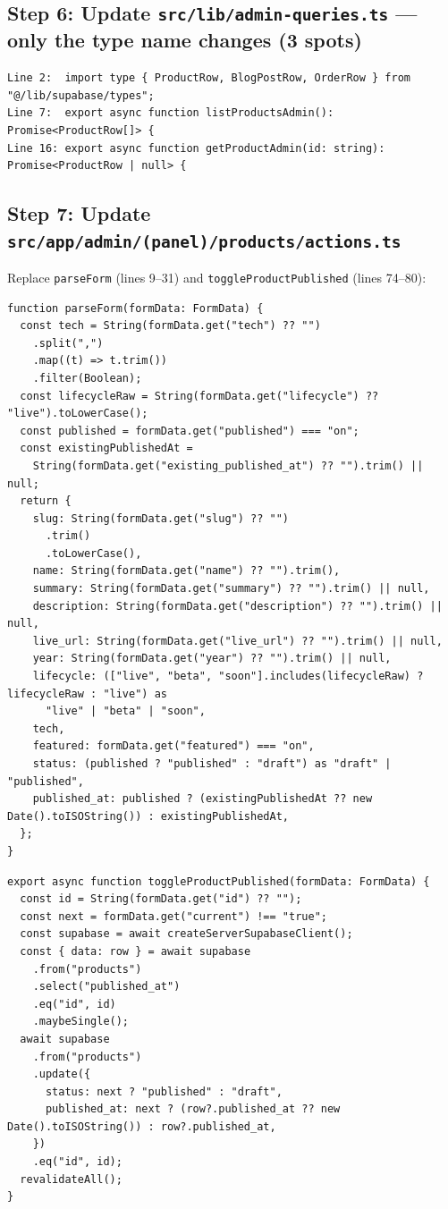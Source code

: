 \documentclass[11pt,a4paper]{article}
\begin{document}
\subsection*{Step 6: Update \texttt{src/lib/admin-queries.ts} --- only the type name changes (3 spots)}

\begin{lstlisting}
Line 2:  import type { ProductRow, BlogPostRow, OrderRow } from "@/lib/supabase/types";
Line 7:  export async function listProductsAdmin(): Promise<ProductRow[]> {
Line 16: export async function getProductAdmin(id: string): Promise<ProductRow | null> {
\end{lstlisting}

\subsection*{Step 7: Update \texttt{src/app/admin/(panel)/products/actions.ts}}

Replace \texttt{parseForm} (lines 9--31) and \texttt{toggleProductPublished} (lines 74--80):

\begin{lstlisting}
function parseForm(formData: FormData) {
  const tech = String(formData.get("tech") ?? "")
    .split(",")
    .map((t) => t.trim())
    .filter(Boolean);
  const lifecycleRaw = String(formData.get("lifecycle") ?? "live").toLowerCase();
  const published = formData.get("published") === "on";
  const existingPublishedAt =
    String(formData.get("existing_published_at") ?? "").trim() || null;
  return {
    slug: String(formData.get("slug") ?? "")
      .trim()
      .toLowerCase(),
    name: String(formData.get("name") ?? "").trim(),
    summary: String(formData.get("summary") ?? "").trim() || null,
    description: String(formData.get("description") ?? "").trim() || null,
    live_url: String(formData.get("live_url") ?? "").trim() || null,
    year: String(formData.get("year") ?? "").trim() || null,
    lifecycle: (["live", "beta", "soon"].includes(lifecycleRaw) ? lifecycleRaw : "live") as
      "live" | "beta" | "soon",
    tech,
    featured: formData.get("featured") === "on",
    status: (published ? "published" : "draft") as "draft" | "published",
    published_at: published ? (existingPublishedAt ?? new Date().toISOString()) : existingPublishedAt,
  };
}
\end{lstlisting}

\begin{lstlisting}
export async function toggleProductPublished(formData: FormData) {
  const id = String(formData.get("id") ?? "");
  const next = formData.get("current") !== "true";
  const supabase = await createServerSupabaseClient();
  const { data: row } = await supabase
    .from("products")
    .select("published_at")
    .eq("id", id)
    .maybeSingle();
  await supabase
    .from("products")
    .update({
      status: next ? "published" : "draft",
      published_at: next ? (row?.published_at ?? new Date().toISOString()) : row?.published_at,
    })
    .eq("id", id);
  revalidateAll();
}
\end{lstlisting}
\end{document}
